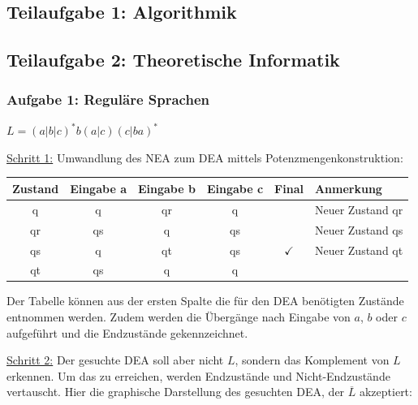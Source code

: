 \subsection{Teilaufgabe 1: Algorithmik}

\subsection{Teilaufgabe 2: Theoretische Informatik}

\subsubsection{Aufgabe 1: Reguläre Sprachen}

\begin{teile}
	\item
	$L=(a|b|c)^*b(a|c)(c|ba)^*$		
	
	\item
	\underline{Schritt 1:} Umwandlung des NEA zum DEA mittels Potenzmengenkonstruktion:
	
	\begin{tabular}{c|c|c|c|c|l}
		\textbf{Zustand} & \textbf{Eingabe a} & \textbf{Eingabe b} & \textbf{Eingabe c} & \textbf{Final} & \textbf{Anmerkung} \\
		\hline
		q                & q                  & qr                 & q                  &                   & Neuer Zustand qr \\
		\hline
		qr               & qs                 & q                  & qs                 &                   & Neuer Zustand qs \\
		\hline
		qs               & q                  & qt                 & qs                 &  $\checkmark$                 & Neuer Zustand qt\\
		\hline
		qt               & qs                 & q                  & q                 &                   & \\
		\hline
	\end{tabular}
	
	Der Tabelle können aus der ersten Spalte die für den DEA benötigten Zustände entnommen werden. Zudem werden die Übergänge nach Eingabe von $a$, $b$ oder $c$ aufgeführt und die Endzustände gekennzeichnet.
	
	\underline{Schritt 2:} Der gesuchte DEA soll aber nicht $L$, sondern das Komplement von $L$ erkennen. Um das zu erreichen, werden Endzustände und Nicht-Endzustände vertauscht. Hier die graphische Darstellung des gesuchten DEA, der $\overline{L}$ akzeptiert:
	

\end{teile}
